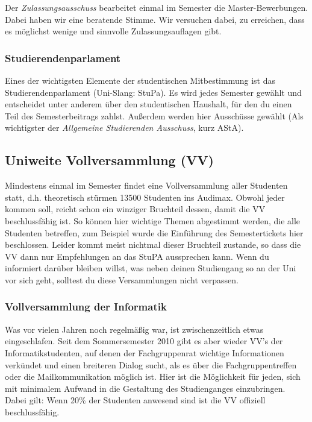 		Der \emph{Zulassungsausschuss} bearbeitet einmal im
		Semester die Master-Bewerbungen. Dabei haben wir eine
		beratende Stimme. Wir versuchen dabei, zu erreichen,
		dass es möglichst wenige  und sinnvolle Zulassungsauflagen gibt.

	\subsubsection*{Studierendenparlament}
		Eines der wichtigsten Elemente der studentischen
		Mitbestimmung ist das Studierendenparlament (Uni-Slang:
		StuPa). Es wird jedes Semester gewählt und entscheidet
		unter anderem über den studentischen Haushalt, für den
		du einen Teil des Semesterbeitrags zahlst. Außerdem werden hier Ausschüsse gewählt (Als wichtigster der \emph{Allgemeine Studierenden Ausschuss}, kurz AStA).
	\subsection*{Uniweite Vollversammlung (VV)}
		Mindestens einmal im Semester findet eine
		Vollversammlung aller Studenten statt, d.h. theoretisch
		stürmen 13500 Studenten ins Audimax. Obwohl jeder kommen
		soll, reicht schon ein winziger Bruchteil dessen, damit
		die VV beschlussfähig ist. So können hier wichtige
		Themen abgestimmt werden, die alle Studenten betreffen,
		zum Beispiel wurde die Einführung des Semestertickets
		hier beschlossen. Leider kommt meist nichtmal dieser
		Bruchteil zustande, so dass die VV dann nur Empfehlungen
		an das StuPA aussprechen kann. Wenn du informiert darüber 
		bleiben willst, was neben deinen Studiengang so an der
		Uni vor sich geht, solltest du diese Versammlungen nicht verpassen.

		\subsubsection*{Vollversammlung der Informatik}
			Was vor vielen Jahren noch regelmäßig war, ist
			zwischenzeitlich etwas eingeschlafen. Seit dem
			Sommersemester 2010 gibt es aber wieder VV's der
			Informatikstudenten, auf denen der
			Fachgruppenrat
			wichtige Informationen verkündet und einen
			breiteren Dialog sucht, als es über die
			Fachgruppentreffen oder die Mailkommunikation
			möglich ist. Hier ist die Möglichkeit für jeden,
			sich mit minimalem Aufwand in die Gestaltung des
			Studienganges einzubringen. Dabei gilt: Wenn
			20\% der Studenten anwesend sind  ist die VV offiziell beschlussfähig.
